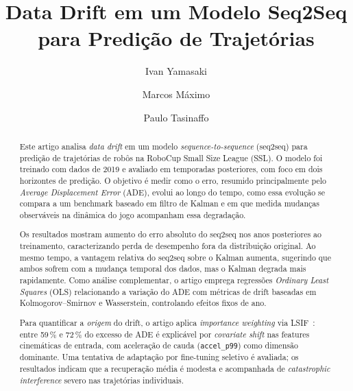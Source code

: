 \documentclass[runningheads]{llncs}
\begin{document}
\title{Data Drift em um Modelo Seq2Seq para Predi\c{c}\~ao de Trajet\'orias}

\author{Ivan Yamasaki\orcidID{} \and
Marcos M\'aximo\orcidID{} \and
Paulo Tasinaffo\orcidID{}}
%
%
%
\maketitle

\begin{abstract}
Este artigo analisa \textit{data drift} em um modelo \textit{sequence-to-sequence} (seq2seq) para predi\c{c}\~ao de trajet\'orias de rob\^os na RoboCup Small Size League (SSL). O modelo foi treinado com dados de 2019 e avaliado em temporadas posteriores, com foco em dois horizontes de predi\c{c}\~ao. O objetivo \'e medir como o erro, resumido principalmente pelo \textit{Average Displacement Error} (ADE), evolui ao longo do tempo, como essa evolu\c{c}\~ao se compara a um benchmark baseado em filtro de Kalman e em que medida mudan\c{c}as observ\'aveis na din\^amica do jogo acompanham essa degrada\c{c}\~ao.

Os resultados mostram aumento do erro absoluto do seq2seq nos anos posteriores ao treinamento, caracterizando perda de desempenho fora da distribui\c{c}\~ao original. Ao mesmo tempo, a vantagem relativa do seq2seq sobre o Kalman aumenta, sugerindo que ambos sofrem com a mudan\c{c}a temporal dos dados, mas o Kalman degrada mais rapidamente. Como an\'alise complementar, o artigo emprega regress\~oes \textit{Ordinary Least Squares} (OLS) relacionando a varia\c{c}\~ao do ADE com m\'etricas de drift baseadas em Kolmogorov--Smirnov e Wasserstein, controlando efeitos fixos de ano.

Para quantificar a \emph{origem} do drift, o artigo aplica \textit{importance weighting} via LSIF~\cite{kliep}: entre 59\,\% e 72\,\% do excesso de ADE \'e explic\'avel por \emph{covariate shift} nas features cinem\'aticas de entrada, com acelera\c{c}\~ao de cauda (\texttt{accel\_p99}) como dimens\~ao dominante. Uma tentativa de adapta\c{c}\~ao por fine-tuning seletivo \'e avaliada; os resultados indicam que a recupera\c{c}\~ao m\'edia \'e modesta e acompanhada de \emph{catastrophic interference} severo nas trajet\'orias individuais.
\end{abstract}
\end{document}
